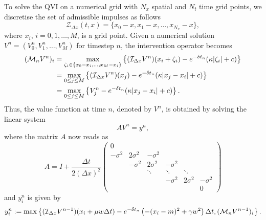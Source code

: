 To solve the QVI on a numerical grid with $N_x$ spatial and $N_t$ time grid points, we discretise the set of admissible impulses as follows
\begin{equation*}
    \mathcal{Z}_{\Delta x}(t,x) = \{x_0-x, x_1-x, \ldots, x_{N_x}-x\},
\end{equation*}
where $x_i$, $i=0,1,\ldots,M$, is a grid point. Given a numerical solution $V^n = (V_0^n, V_1^n, \ldots, V_M^n)$ for timestep $n$, the intervention operator becomes
\begin{align*}
    (\mathcal{M}_nV^n)_i &= \max_{\zeta_i \in \{x_0-x_i, \ldots, x_M-x_i\}} \left\{ (\mathcal{I}_{\Delta x} V^n)(x_i+\zeta_i) - e^{-\delta t_n}(\kappa |\zeta_i| + c) \right\} \nonumber \\
    &= \max_{0 \leq j \leq M} \left\{ (\mathcal{I}_{\Delta x} V^n)(x_j) - e^{-\delta t_n}(\kappa |x_j-x_i| + c) \right\} \nonumber  \\
    &= \max_{0 \leq j \leq M} \left\{ V^n_j - e^{-\delta t_n}(\kappa |x_j-x_i| + c) \right\}.
\end{align*}
Thus, the value function at time $n$, denoted by $V^n$, is obtained by solving the linear system
\begin{equation*}
    AV^n = y^n,
\end{equation*}
where the matrix $A$ now reads as
\begin{equation*}
    A = I + \frac{\Delta t}{2 (\Delta x)^2}
    \begin{pmatrix}
        0 \\
        -\sigma^2 & 2\sigma^2 & -\sigma^2 \\
        & -\sigma^2 & 2\sigma^2 & -\sigma^2 \\
        & & \ddots & \ddots & \ddots \\
        & & & -\sigma^2 & 2\sigma^2 & -\sigma^2 \\
        & & & & & 0
    \end{pmatrix}
\end{equation*}
and $y_i^n$ is given by
\begin{equation*}
    y_i^n := \max \left\{ (\mathcal{I}_{\Delta x}V^{n-1})(x_i + \mu w \Delta t) - e^{-\delta t_n} \left(-(x_i-m)^2 + \gamma w^2 \right)\Delta t, (\mathcal{M}_nV^{n-1})_i \right\}.
\end{equation*}

